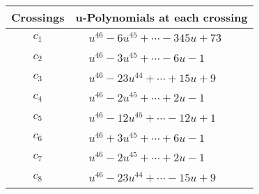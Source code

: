 \documentclass[1p]{elsarticle_modified}
\theoremstyle{definition}
\begin{document}
\begin{tabular}{m{50pt}|m{274pt}}
Crossings & \hspace{64pt}u-Polynomials at each crossing \\
\hline $$\begin{aligned}c_{1}\end{aligned}$$&$\begin{aligned}
&u^{46}-6 u^{45}+\cdots-345 u+73
\end{aligned}$\\
\hline $$\begin{aligned}c_{2}\end{aligned}$$&$\begin{aligned}
&u^{46}-3 u^{45}+\cdots-6 u-1
\end{aligned}$\\
\hline $$\begin{aligned}c_{3}\end{aligned}$$&$\begin{aligned}
&u^{46}-23 u^{44}+\cdots+15 u+9
\end{aligned}$\\
\hline $$\begin{aligned}c_{4}\end{aligned}$$&$\begin{aligned}
&u^{46}-2 u^{45}+\cdots+2 u-1
\end{aligned}$\\
\hline $$\begin{aligned}c_{5}\end{aligned}$$&$\begin{aligned}
&u^{46}-12 u^{45}+\cdots-12 u+1
\end{aligned}$\\
\hline $$\begin{aligned}c_{6}\end{aligned}$$&$\begin{aligned}
&u^{46}+3 u^{45}+\cdots+6 u-1
\end{aligned}$\\
\hline $$\begin{aligned}c_{7}\end{aligned}$$&$\begin{aligned}
&u^{46}-2 u^{45}+\cdots+2 u-1
\end{aligned}$\\
\hline $$\begin{aligned}c_{8}\end{aligned}$$&$\begin{aligned}
&u^{46}-23 u^{44}+\cdots-15 u+9
\end{aligned}$\\

\end{tabular}
\end{document}
